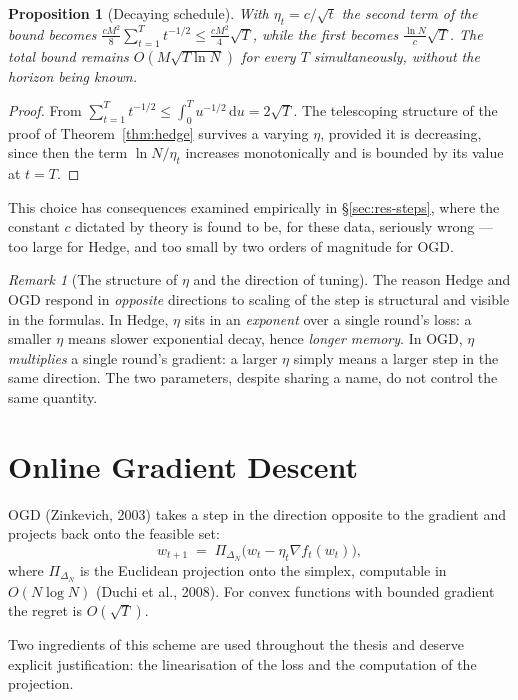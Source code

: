 \documentclass[12pt,a4paper,oneside]{report}
\renewcommand{\_}{\oldunderscore\allowbreak}
\theoremstyle{definition}
\theoremstyle{plain}
\newtheorem{proposition}[theorem]{Proposition}
\theoremstyle{remark}
\newtheorem{remark}[theorem]{Remark}
\begin{document}
\begin{proposition}[Decaying schedule]
\label{prop:anytime}
With $\eta_t = c/\sqrt{t}$ the second term of the bound becomes
$\frac{c M^2}{8}\sum_{t=1}^{T} t^{-1/2} \leq \frac{c M^2}{4}\sqrt{T}$, while the first becomes
$\frac{\ln N}{c}\sqrt{T}$. The total bound remains $O(M\sqrt{T\ln N})$ for every $T$
simultaneously, without the horizon being known.
\end{proposition}

\begin{proof}
From $\sum_{t=1}^{T} t^{-1/2} \leq \int_0^T u^{-1/2}\,\mathrm{d}u = 2\sqrt{T}$. The telescoping
structure of the proof of Theorem~\ref{thm:hedge} survives a varying $\eta$, provided it is
decreasing, since then the term $\ln N/\eta_t$ increases monotonically and is bounded by its
value at $t=T$.
\end{proof}

This choice has consequences examined empirically in \S\ref{sec:res-steps}, where the constant
$c$ dictated by theory is found to be, for these data, seriously wrong --- too large for Hedge,
and too small by two orders of magnitude for OGD.

\begin{remark}[The structure of $\eta$ and the direction of tuning]
The reason Hedge and OGD respond in \emph{opposite} directions to scaling of the step is
structural and visible in the formulas. In Hedge, $\eta$ sits in an \emph{exponent} over a
single round's loss: a smaller $\eta$ means slower exponential decay, hence \emph{longer
memory}. In OGD, $\eta$ \emph{multiplies} a single round's gradient: a larger $\eta$ simply
means a larger step in the same direction. The two parameters, despite sharing a name, do not
control the same quantity.
\end{remark}

\section{Online Gradient Descent}

OGD (Zinkevich, 2003) takes a step in the direction opposite to the gradient and projects back
onto the feasible set:
\[
w_{t+1} \;=\; \Pi_{\Delta_N}\!\big(w_t - \eta_t \nabla f_t(w_t)\big),
\]
where $\Pi_{\Delta_N}$ is the Euclidean projection onto the simplex, computable in
$O(N \log N)$ (Duchi et al., 2008). For convex functions with bounded gradient the regret is
$O(\sqrt{T})$.

Two ingredients of this scheme are used throughout the thesis and deserve explicit
justification: the linearisation of the loss and the computation of the projection.
\end{document}
